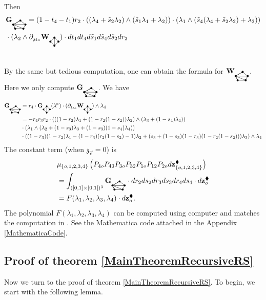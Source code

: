 \documentclass[11pt]{amsart}
\newcommand{\bgraphG}{
  \mathbf{G}_{\tikz[baseline=-0.5ex]{
      \coordinate (A) at (0,0);
      \coordinate (B) at (4mm,0);
      \coordinate (C) at (5mm,2mm);
      \coordinate (D) at (2.5mm,4mm);
      \coordinate (E) at (-1mm,2mm);

      \fill (A) circle (0.5mm);
      \fill (B) circle (0.5mm);
      \fill (C) circle (0.5mm);
      \fill (D) circle (0.5mm);
      \fill (E) circle (0.5mm);

      \draw (A) -- (B);
      \draw (B) -- (C);
      \draw (C) -- (D);
      \draw (D) -- (E);
      \draw (E) -- (A);

      \draw (E) -- (A);
      \draw (E) -- (B);
      \draw (E) -- (C);
      \draw (E) -- (D);
  }}
}
\newcommand{\bgraphW}{
  \mathbf{W}_{\tikz[baseline=-0.5ex]{
      \coordinate (A) at (0,0);
      \coordinate (B) at (4mm,0);
      \coordinate (C) at (5mm,2mm);
      \coordinate (D) at (2.5mm,4mm);
      \coordinate (E) at (-1mm,2mm);

      \fill (A) circle (0.5mm);
      \fill (B) circle (0.5mm);
      \fill (C) circle (0.5mm);
      \fill (D) circle (0.5mm);
      \fill (E) circle (0.5mm);

      \draw (A) -- (B);
      \draw (B) -- (C);
      \draw (C) -- (D);
      \draw (D) -- (E);
      \draw (E) -- (A);

      \draw (E) -- (A);
      \draw (E) -- (B);
      \draw (E) -- (C);
      \draw (E) -- (D);
  }}
}
\newcommand{\agraphG}{
  \mathbf{G}_{\tikz[baseline=-0.5ex]{
      \coordinate (A) at (0,0);
      \coordinate (B) at (4mm,0);
      \coordinate (C) at (2mm,2mm);
      \coordinate (D) at (2mm,-2mm);

      \fill (A) circle (0.5mm);
      \fill (B) circle (0.5mm);
      \fill (C) circle (0.5mm);
      \fill (D) circle (0.5mm);

      \draw (A) -- (C);
      \draw (A) -- (D);
      \draw (C) -- (D);
      \draw (B) -- (C);
      \draw (B) -- (D);
  }}
}
\newcommand{\agraphW}{
  \mathbf{W}_{\tikz[baseline=-0.5ex]{
      \coordinate (A) at (0,0);
      \coordinate (B) at (4mm,0);
      \coordinate (C) at (2mm,2mm);
      \coordinate (D) at (2mm,-2mm);

      \fill (A) circle (0.5mm);
      \fill (B) circle (0.5mm);
      \fill (C) circle (0.5mm);
      \fill (D) circle (0.5mm);

      \draw (A) -- (C);
      \draw (A) -- (D);
      \draw (C) -- (D);
      \draw (B) -- (C);
      \draw (B) -- (D);
  }}
}
\theoremstyle{definition}
\theoremstyle{remark}
\numberwithin{equation}{section}
\begin{document}
  Then
  \begin{align*}
 &\bgraphG =  (1-t_4-t_1)r_2\cdot((\lambda_4+\tilde{s}_2\lambda_2)\wedge(\tilde{s}_1\lambda_1+\lambda_2))\cdot (\lambda_1\wedge(\tilde{s}_4(\lambda_4+\tilde{s}_2\lambda_2)+\lambda_3)) \\ &\cdot  (\lambda_2\wedge \partial_{\mathfrak{z}_{4o}}\agraphW)\cdot dt_1dt_4d\tilde{s}_1d\tilde{s}_4d\tilde{s}_2dr_2 \\
     &
  \end{align*}
\fi

By the same but tedious computation, one can obtain the formula for $\bgraphW$. Here we only compute $\bgraphG$.
We have
\begin{align*}
   \bgraphG&= r_4\cdot \agraphG(\lambda^\triangleright) \cdot(\partial_{\mathfrak{z}_{3o}}\agraphW)\wedge \lambda_4  \\
   &=-r_4r_3r_2\cdot \left(\left((1-r_2)\lambda_1+(1-r_2(1-s_2))\lambda_2\right)\wedge (\lambda_3+(1-s_4)\lambda_4)\right) \\
   & \cdot\left(\lambda_1\wedge\left(\lambda_2+(1-s_3)\lambda_3+(1-s_3)(1-s_4)\lambda_4\right) \right)\\ &\cdot  \left((1-r_3)(1-r_2)\lambda_1-(1-r_3)(r_2(1-s_2)-1)\lambda_2+(s_3+(1-s_3)(1-r_3)(1-r_2(1-s_2)))\lambda_3\right)\wedge \lambda_4
\end{align*}
The constant term (when $\mathfrak{z}_{\vec{e}}=0$) is
    \begin{align*}
&\mu_{\{o,1,2,3,4\}}\left(P_{4o}P_{43}P_{3o}P_{32}P_{1o}P_{12}P_{2o}d\mathbf{z}^{\blacklozenge}_{\{o,1,2,3,4\}}\right)
\\
&=\int_{([0,1]\times[0,1])^3}\bgraphG\cdot dr_2ds_2dr_3ds_3dr_4ds_4\cdot d\mathbf{z}^{\blacklozenge}_o\\
&=F(\lambda_1,\lambda_2,\lambda_3,\lambda_4)\cdot d\mathbf{z}^{\blacklozenge}_o.
  \end{align*}
  The polynomial $F(\lambda_1,\lambda_2,\lambda_3,\lambda_4)$ can be computed using computer and matches the
  computation in \cite{Gaiotto:2024gii}. See the Mathematica code attached in the Appendix \ref{MathematicaCode}.

  \subsection{Proof of theorem \ref{MainTheoremRecursiveRS}}
  Now we turn to the proof of theorem \ref{MainTheoremRecursiveRS}.
  To begin, we start with the following lemma.
\end{document}
